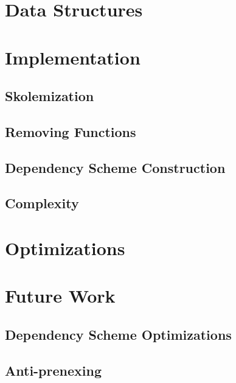 \section{Data Structures}

\section{Implementation}
\subsection{Skolemization}
\subsection{Removing Functions}
\subsection{Dependency Scheme Construction}
\subsection{Complexity}

\section{Optimizations}

\section{Future Work}
\subsection{Dependency Scheme Optimizations}
\subsection{Anti-prenexing}
